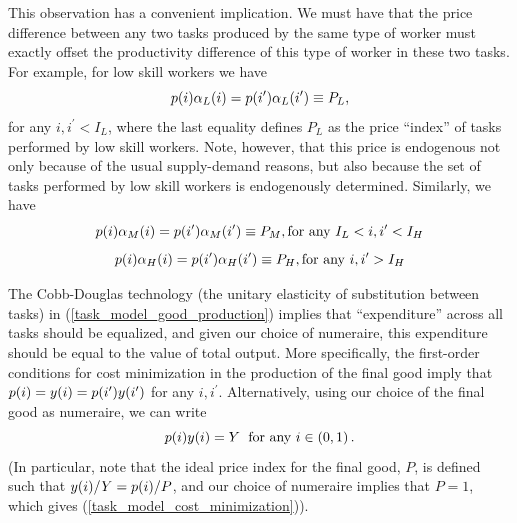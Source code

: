 \documentclass[12pt]{article}
\theoremstyle{definition}
\begin{document}
This observation has a convenient implication. We must have that the price difference between any two tasks produced by the same type of worker must exactly offset the productivity difference of this type of worker in these two tasks. For example, for low skill workers we have
\begin{equation} 
    \label{task_model_price_index_for_low_skill}
	p{\left( i \right)} \alpha_L{\left( i \right)} = p{\left( i^\prime \right)} \alpha_L{\left( i^\prime \right)} \equiv P_L,
\end{equation}
for any $i, i^\prime < I_L$, where the last equality defines $P_L$ as the price ``index'' of tasks performed by low skill workers. Note, however, that this price is endogenous not only because of the usual supply-demand reasons, but also because the set of tasks performed by low skill workers is endogenously determined. Similarly, we have 
\begin{equation} 
    \label{task_model_price_index_for_medium_skill}
	p{\left( i \right)} \alpha_M{\left( i \right)} = p{\left( i^\prime \right)} \alpha_M{\left( i^\prime \right)} \equiv P_M, \text{for any } I_L < i, i^\prime < I_H
\end{equation}
\begin{equation} 
    \label{task_model_price_index_for_high_skill}
	p{\left( i \right)} \alpha_H{\left( i \right)} = p{\left( i^\prime \right)} \alpha_H{\left( i^\prime \right)} \equiv P_H, \text{for any } i, i^\prime > I_H
\end{equation}

The Cobb-Douglas technology (the unitary elasticity of substitution between tasks) in (\ref{task_model_good_production}) implies that ``expenditure'' across all tasks should be equalized, and given our choice of numeraire, this expenditure should be equal to the value of total output. More specifically, the first-order conditions for cost minimization in the production of the final good imply that $p{\left( i \right)} = y{\left( i \right)} = p{\left( i^\prime \right)} y{\left( i^\prime \right)}$ for any $i, i^\prime$. Alternatively, using our choice of the final good as numeraire, we can write 
\begin{equation} 
    \label{task_model_cost_minimization}
	p{\left( i \right)} y{\left( i \right)} = Y \; \text{ for any } i \in \left( 0, 1 \right).
\end{equation}
(In particular, note that the ideal price index for the final good, $P$, is defined such that $y{\left( i \right)}/ Y = p{\left( i \right)}/P$, and our choice of numeraire implies that $P=1$, which gives (\ref{task_model_cost_minimization})).
\end{document}

